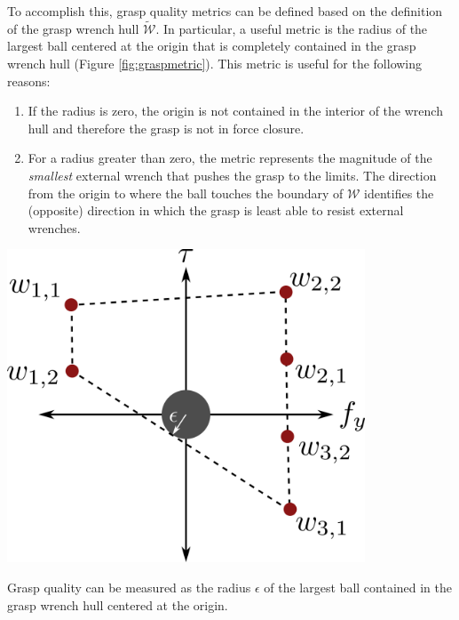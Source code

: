 To accomplish this, grasp quality metrics can be defined based on the definition of the grasp wrench hull $\tilde{\mathcal{W}}$. In particular, a useful metric is the radius of the largest ball centered at the origin that is completely contained in the grasp wrench hull (Figure \ref{fig:graspmetric}). This metric is useful for the following reasons:
\begin{enumerate}
    \item If the radius is zero, the origin is not contained in the interior of the wrench hull and therefore the grasp is not in force closure.
    \item For a radius greater than zero, the metric represents the magnitude of the \textit{smallest} external wrench that pushes the grasp to the limits. The direction from the origin to where the ball touches the boundary of $\mathcal{W}$ identifies the (opposite) direction in which the grasp is least able to resist external wrenches.
\end{enumerate}
\begin{marginfigure}[-12\baselineskip]
\begin{center}
\includegraphics[width=0.8\textwidth]{tex/figs/ch26_figs/2Dexample_c.png}
\caption{Grasp quality can be measured as the radius $\epsilon$ of the largest ball contained in the grasp wrench hull centered at the origin.}
\label{fig:graspmetric}
\end{center}
\end{marginfigure}

